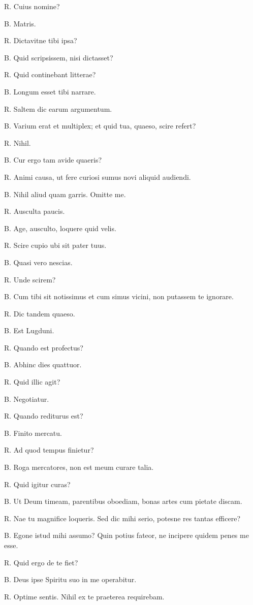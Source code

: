 \documentclass{article}
\begin{document}
R. Cuius nomine?

B. Matris. 

R. Dictavitne tibi ipsa?

B. Quid scripsissem, nisi dictasset?

R. Quid continebant litterae?

B. Longum esset tibi narrare. 

R. Saltem dic earum argumentum. 

B. Varium erat et multiplex; et quid tua, quaeso, scire refert?

R. Nihil. 

B. Cur ergo tam avide quaeris?

R. Animi causa, ut fere curiosi sumus novi aliquid audiendi. 

B. Nihil aliud quam garris. Omitte me. 

R. Ausculta paucis. 

B. Age, ausculto, loquere quid velis.

R. Scire cupio ubi sit pater tuus.

B. Quasi vero nescias. 

R. Unde scirem?

B. Cum tibi sit notissimus et cum simus vicini, non putassem te ignorare. 

R. Dic tandem quaeso. 

B. Est Lugduni. 

R. Quando est profectus?

B. Abhinc dies quattuor. 

R. Quid illic agit?

B. Negotiatur. 

R. Quando rediturus est?

B. Finito mercatu. 

R. Ad quod tempus finietur?

B. Roga mercatores, non est meum curare talia. 

R. Quid igitur curas?

B. Ut Deum timeam, parentibus oboediam, bonas artes cum pietate discam. 

R. Nae tu magnifice loqueris. Sed dic mihi serio, potesne res tantas efficere?

B. Egone istud mihi assumo? Quin potius fateor, ne incipere quidem penes me esse. 

R. Quid ergo de te fiet?

B. Deus ipse Spiritu suo in me operabitur. 

R. Optime sentis. Nihil ex te praeterea requirebam. 
\end{document}
